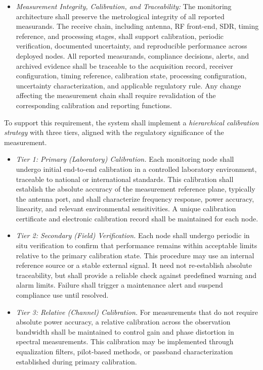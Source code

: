 \documentclass[11pt]{report}
\begin{document}
\begin{itemize}[label=--]
	\item
	\textit{Measurement Integrity, Calibration, and Traceability:}
	The monitoring architecture shall preserve the metrological integrity of all reported measurands. The receive chain, including antenna, RF front-end, SDR, timing reference, and processing stages, shall support calibration, periodic verification, documented uncertainty, and reproducible performance across deployed nodes. All reported measurands, compliance decisions, alerts, and archived evidence shall be traceable to the acquisition record, receiver configuration, timing reference, calibration state, processing configuration, uncertainty characterization, and applicable regulatory rule. Any change affecting the measurement chain shall require revalidation of the corresponding calibration and reporting functions.
	
\end{itemize}

\noindent
To support this requirement, the system shall implement a \textit{hierarchical calibration strategy} with three tiers, aligned with the regulatory significance of the measurement.

\begin{itemize}[label=--]
	
	\item
	\textit{Tier 1: Primary (Laboratory) Calibration.}
	Each monitoring node shall undergo initial end-to-end calibration in a controlled laboratory environment, traceable to national or international standards. This calibration shall establish the absolute accuracy of the measurement reference plane, typically the antenna port, and shall characterize frequency response, power accuracy, linearity, and relevant environmental sensitivities. A unique calibration certificate and electronic calibration record shall be maintained for each node.
	
	\item
	\textit{Tier 2: Secondary (Field) Verification.}
	Each node shall undergo periodic in situ verification to confirm that performance remains within acceptable limits relative to the primary calibration state. This procedure may use an internal reference source or a stable external signal. It need not re-establish absolute traceability, but shall provide a reliable check against predefined warning and alarm limits. Failure shall trigger a maintenance alert and suspend compliance use until resolved.
	
	\item
	\textit{Tier 3: Relative (Channel) Calibration.}
	For measurements that do not require absolute power accuracy, a relative calibration across the observation bandwidth shall be maintained to control gain and phase distortion in spectral measurements. This calibration may be implemented through equalization filters, pilot-based methods, or passband characterization established during primary calibration.
	
\end{itemize}
\end{document}
